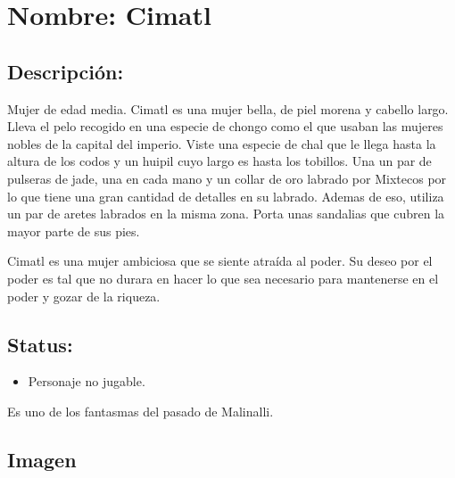 \section{Nombre: Cimatl}  \label{per:cimatl}
\subsection{Descripción:} 
Mujer de edad media. Cimatl es una mujer bella, de piel morena y cabello largo. Lleva el pelo recogido en una especie de chongo como el que usaban las mujeres nobles de la capital del imperio. Viste una especie de chal que le llega hasta la altura de los codos y un huipil cuyo largo es hasta los tobillos. Una un par de pulseras de jade, una en cada mano y un collar de oro labrado por Mixtecos por lo que tiene una gran cantidad de detalles en su labrado. Ademas de eso, utiliza un par de aretes labrados en la misma zona. Porta unas sandalias que cubren la mayor parte de sus pies.
\\
\par
Cimatl es una mujer ambiciosa que se siente atraída al poder. Su deseo por el poder es tal que no durara en hacer lo que sea necesario para mantenerse en el poder y gozar de la riqueza.        
\subsection{Status:}
\begin{itemize}
		\item Personaje no jugable.
	\end{itemize}
Es uno de los fantasmas del pasado de Malinalli.
\subsection{Imagen}
